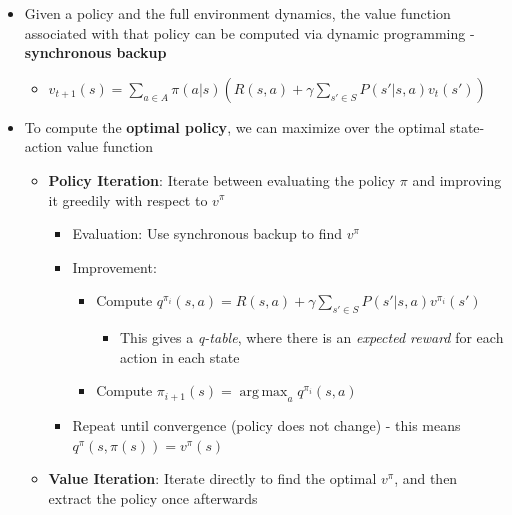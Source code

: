 \documentclass[twocolumn]{article}
\providecommand{\tightlist}{%
  \setlength{\itemsep}{\GlobalItemSep}\setlength{\parskip}{\GlobalListParSkip}}
\newlength{\GlobalItemSep}
\newlength{\GlobalListParSkip}
\DeclareMathOperator*{\argmax}{arg\,max}
\begin{document}
\begin{itemize}
\begin{itemize}
\begin{itemize}
      \begin{itemize}
      \tightlist
      \item
        Intuition: The immediate action is given (as a parameter), so we
        just need to marginalize the \emph{next state} given the current
        state and chosen action; from there, we average over all
        action-value functions as well
      \end{itemize}
    \end{itemize}
  \end{itemize}
\item
  Given a policy and the full environment dynamics, the value function
  associated with that policy can be computed via dynamic programming -
  \textbf{synchronous backup}

  \begin{itemize}
  \tightlist
  \item
    \(v_{t+1}(s) = \sum_{a \in A}\pi(a|s) (R(s, a) + \gamma \sum_{s' \in S} P(s' | s, a) v_t (s'))\)
  \end{itemize}
\item
  To compute the \textbf{optimal policy}, we can maximize over the
  optimal state-action value function

  \begin{itemize}
  \tightlist
  \item
    \textbf{Policy Iteration}: Iterate between evaluating the policy
    \(\pi\) and improving it greedily with respect to \(v^\pi\)

    \begin{itemize}
    \tightlist
    \item
      Evaluation: Use synchronous backup to find \(v^\pi\)
    \item
      Improvement:

      \begin{itemize}
      \tightlist
      \item
        Compute
        \(q^{\pi_i}(s, a) = R(s, a) + \gamma \sum_{s' \in S}P(s' | s, a) v^{\pi_i}(s')\)

        \begin{itemize}
        \tightlist
        \item
          This gives a \emph{q-table}, where there is an \emph{expected
          reward} for each action in each state
        \end{itemize}
      \item
        Compute \(\pi_{i + 1}(s) = \argmax_{a} q^{\pi_i}(s, a)\)
      \end{itemize}
    \item
      Repeat until convergence (policy does not change) - this means
      \(q^\pi(s, \pi(s)) = v^\pi(s)\)
    \end{itemize}
  \item
    \textbf{Value Iteration}: Iterate directly to find the optimal
    \(v^\pi\), and then extract the policy once afterwards


\end{itemize}
\end{itemize}
\end{document}
